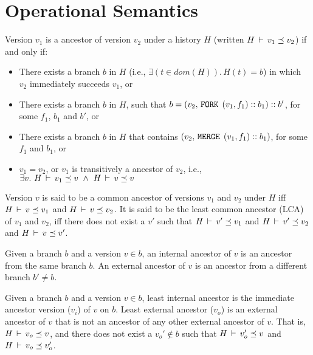 \section{Operational Semantics}



\begin{definition} 
Version $v_1$ is a ancestor of version $v_2$ under a history
$H$ (written $H\,\vdash\,v_1 \preceq v_2$) if and only if:
\begin{itemize}
  \item There exists a branch $b$ in $H$ (i.e., $\exists(t\in
  dom(H)).\,H(t) = b$) in which $v_2$ immediately succeeds
  $v_1$, or
  \item There exists a branch $b$ in $H$, such that $b = (v_2, 
  \,{\tt FORK}\,\; (v_1,f_1)::b_1)::b'$, for some $f_1$, $b_1$ and $b'$, or
  \item There exists a branch $b$ in $H$ that contains
  $(v_2, \,{\tt MERGE}\,\;(v_1,f_1)::b_1)$, for some $f_1$ and $b_1$, or
  \item $v_1 = v_2$, or $v_1$ is transitively a ancestor of
  $v_2$, i.e., $\exists v.~ H\,\vdash\,v_1 \preceq v ~\wedge~
  H\,\vdash\,v \preceq v$ 
\end{itemize}
\end{definition}

\begin{definition} 
Version $v$ is said to be a common ancestor of versions $v_1$
and $v_2$ under $H$ iff $H\,\vdash\,v \preceq v_1$ and $H\,\vdash\,v
\preceq v_2$. It is said to be the least common ancestor
(LCA) of $v_1$ and $v_2$, iff there does not exist a $v'$ such that
$H\,\vdash\,v' \preceq v_1$ and $H\,\vdash\,v' \preceq v_2$ and
$H\,\vdash\,v \preceq v'$.
\end{definition}

\begin{definition} 
Given a branch $b$ and a version $v\in b$, an internal ancestor of $v$
is an ancestor from the same branch $b$. An external ancestor of $v$
is an ancestor from a different branch $b'\neq b$. 
\end{definition}

\begin{definition} 
Given a branch $b$ and a version $v\in b$, least internal ancestor is
the immediate ancestor version ($v_i$) of $v$ on $b$. Least external
ancestor ($v_o$) is an external ancestor of $v$ that is not an
ancestor of any other external ancestor of $v$. That is,
$H\,\vdash\,v_o \preceq v$, and there does not exist a $v_o' \not\in
b$ such that $H\,\vdash\,v_o' \preceq v$ and $H\,\vdash\,v_o \preceq
v_o'$. 
\end{definition}

